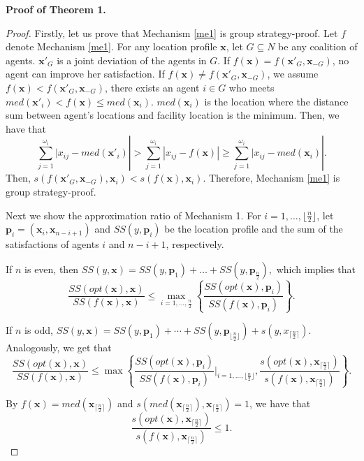 \documentclass[runningheads]{11llncst}
\begin{document}
\noindent
\textbf{Proof of Theorem 1.}
\begin{proof}
    Firstly, let us prove that Mechanism \ref{me1} is group strategy-proof. Let $f$ denote Mechanism \ref{me1}. For  any location profile $\textbf{x}$, let $G\subseteq N$ be any coalition of agents. $\textbf{x}'_G$ is a joint deviation of the agents in $G$. If $f(\textbf{x})=f(\textbf{x}'_G,\textbf{x}_{-G})$, no agent can improve her satisfaction. If $f(\textbf{x})\neq f(\textbf{x}'_G,\textbf{x}_{-G})$, we assume $f(\textbf{x})<f(\textbf{x}'_G,\textbf{x}_{-G})$, there exists an agent $i\in G$ who meets $med(\textbf{x}'_i)<f(\textbf{x})\leq med(\textbf{x}_i)$. $med(\textbf{x}_i)$ is the location where the distance sum  between agent's locations and  facility location is the minimum. Then, we have that $$\sum_{j=1}^{\omega_i}{|x_{ij}-med(\textbf{x}'_i)}|>\sum_{j=1}^{\omega_i}{|x_{ij}-f(\textbf{x})|}\geq \sum_{j=1}^{\omega_i}{|x_{ij}-med(\textbf{x}_i)}|.$$ Then, $s(f(\textbf{x}'_G,\textbf{x}_{-G}),\textbf{x}_i)<s(f(\textbf{x}),\textbf{x}_i)$. Therefore, Mechanism \ref{me1} is group strategy-proof.  
    
    Next we show the approximation ratio of Mechanism 1.   For $i=1,\dots,\lfloor\frac{n}{2}\rfloor$, let $\textbf{p}_i=(\textbf{x}_i,\textbf{x}_{n-i+1})$ and $SS(y,\textbf{p}_i)$ be the location profile and the sum of the satisfactions of agents $i$ and $n-i+1$, respectively. 
	
	If $n$ is even, then $SS(y, \textbf{x}) = SS(y, \textbf{p}_1) +\dots + SS(y, \textbf{p}_{\frac{n}{2}}),$ which implies that $$\frac{SS(opt(\textbf{x}), \textbf{x})}{SS(f(\textbf{x}), \textbf{x})}\leq \max_{i=1,\dots,\frac{n}{2}}\left\{\frac{SS(opt(\textbf{x}), \textbf{p}_i)}{SS(f(\textbf{x}), \textbf{p}_i)}\right\}.$$
	
	If $n$ is odd, $SS(y, \textbf{x}) = SS(y, \textbf{p}_1) + \cdots +SS(y, \textbf{p}_{\lfloor\frac{n}{2} \rfloor}) + s(y, x_{\lceil\frac{n}{2}\rceil})$. Analogously, we get that $$\frac{SS(opt(\textbf{x}), \textbf{x})}{SS(f(\textbf{x}), \textbf{x})}\leq \max\left\{ \frac{SS(opt(\textbf{x}), \textbf{p}_i)}{SS(f(\textbf{x}), \textbf{p}_i)} |_{i=1,\dots,\lfloor\frac{n}{2}\rfloor},\frac{s(opt(\textbf{x}), \textbf{x}_{\lceil\frac{n}{2}\rceil})}{s(f(\textbf{x}), \textbf{x}_{\lceil\frac{n}{2}\rceil})}\right\}.$$
	
	 By $f(\textbf{x})=med(\textbf{x}_{\lceil\frac{n}{2}\rceil})$ and $s(med(\textbf{x}_{\lceil\frac{n}{2}\rceil}), \textbf{x}_{\lceil\frac{n}{2}\rceil})=1$,   we have  that $$\frac{s(opt(\textbf{x}), \textbf{x}_{\lceil\frac{n}{2}\rceil})}{s(f(\textbf{x}), \textbf{x}_{\lceil\frac{n}{2}\rceil})} \leq 1.$$
	

\end{proof}
\end{document}
